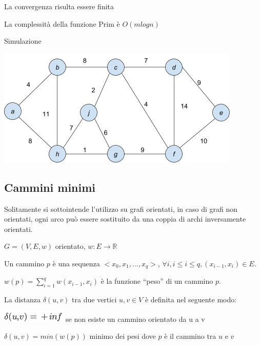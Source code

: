 \documentclass{article}
\begin{document}
{{{\protect\hypertarget{t.8fdb0455858db4c6dd05987cee7bc92788c770bd}{}{}\protect\hypertarget{t.44}{}{}



La convergenza risulta essere finita

La complessità della funzione Prim è $O(m logn)$

{Simulazione}

{\includegraphics{images/image542.png}}

\subsection{\texorpdfstring{{Cammini minimi}}{Cammini minimi}}\label{h.yl5v086nw9el}

{Solitamente si sottointende l'utilizzo su grafi orientati, in caso di grafi non orientati, ogni arco può essere sostituito da una coppia di archi inversamente orientati.}

$G=(V,E,w)$ orientato, $w:E\rightarrow \mathbb{R}$

Un cammino $p$ è una sequenza $<x_0,x_1,...,x_q>$, $\forall i, i\leq i \leq q, (x_{i-1},x_i) \in E$.

$w(p)=\sum_{i=1}^{q} w(x_{i-1},x_i)$ è la funzione ``peso'' di un cammino $p$.

{La distanza $\delta(u,v)$ tra due vertici $u,v \in V$ è definita nel seguente modo:}

\includegraphics{images/image496.png}{~se non esiste un cammino orientato da u a v}

{$\delta(u,v)=min(w(p))$ minimo dei pesi dove $p$ è il cammino tra $u$ e $v$}

\subsection{\texorpdfstring{{}}{}}\label{h.h641h77p7srj}

}}}
\end{document}
